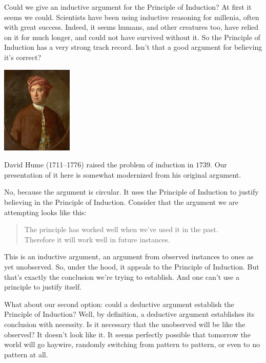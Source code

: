 \documentclass[justified]{tufte-book}
\newenvironment{argument}{\begin{quote}\normalsize}{\end{quote}}
\begin{document}
Could we give an inductive argument for the Principle of Induction? At first it seems we could. Scientists have been using inductive reasoning for millenia, often with great success. Indeed, it seems humans, and other creatures too, have relied on it for much longer, and could not have survived without it. So the Principle of Induction has a very strong track record. Isn't that a good argument for believing it's correct?

\begin{marginfigure}
\includegraphics[width=1.33in]{img/hume} \caption[David Hume (1711--1776) raised the problem of induction in $1739$]{David Hume (1711--1776) raised the problem of induction in $1739$. Our presentation of it here is somewhat modernized from his original argument.}\label{fig:unnamed-chunk-53}
\end{marginfigure}

No, because the argument is circular. It uses the Principle of Induction to justify believing in the Principle of Induction. Consider that the argument we are attempting looks like this:

\begin{argument}
The principle has worked well when we've used it in the past.\\
Therefore it will work well in future instances.
\end{argument}

This is an inductive argument, an argument from observed instances to ones as yet unobserved. So, under the hood, it appeals to the Principle of Induction. But that's exactly the conclusion we're trying to establish. And one can't use a principle to justify itself.

What about our second option: could a deductive argument establish the Principle of Induction? Well, by definition, a deductive argument establishes its conclusion with necessity. Is it necessary that the unobserved will be like the observed? It doesn't look like it. It seems perfectly possible that tomorrow the world will go haywire, randomly switching from pattern to pattern, or even to no pattern at all.
\end{document}
